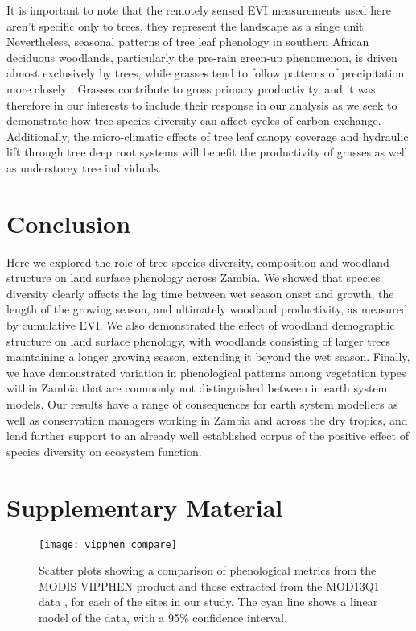 \documentclass[11pt,a4paper]{article}
\newcommand{\beginsupplement}{%
	\setcounter{table}{0}
	\renewcommand{\thetable}{S\arabic{table}}%
	\setcounter{figure}{0}
	\renewcommand{\thefigure}{S\arabic{figure}}%
	}
\begin{document}
It is important to note that the remotely sensed EVI measurements used here aren't specific only to trees, they represent the landscape as a singe unit. Nevertheless, seasonal patterns of tree leaf phenology in southern African deciduous woodlands, particularly the pre-rain green-up phenomenon, is driven almost exclusively by trees, while grasses tend to follow patterns of precipitation more closely \citep{Whitecross2017, Archibald2007, Higgins2011}. Grasses contribute to gross primary productivity, and it was therefore in our interests to include their response in our analysis as we seek to demonstrate how tree species diversity can affect cycles of carbon exchange. Additionally, the micro-climatic effects of tree leaf canopy coverage and hydraulic lift through tree deep root systems will benefit the productivity of grasses as well as understorey tree individuals.

\section{Conclusion}

Here we explored the role of tree species diversity, composition and woodland structure on land surface phenology across Zambia. We showed that species diversity clearly affects the lag time between wet season onset and growth, the length of the growing season, and ultimately woodland productivity, as measured by cumulative EVI. We also demonstrated the effect of woodland demographic structure on land surface phenology, with woodlands consisting of larger trees maintaining a longer growing season, extending it beyond the wet season. Finally, we have demonstrated variation in phenological patterns among vegetation types within Zambia that are commonly not distinguished between in earth system models. Our results have a range of consequences for earth system modellers as well as conservation managers working in Zambia and across the dry tropics, and lend further support to an already well established corpus of the positive effect of species diversity on ecosystem function.

\printbibliography

\section{Supplementary Material}
\beginsupplement

\begin{figure}[H]
\centering
	\texttt{[image: vipphen\_compare]}
	\caption{Scatter plots showing a comparison of phenological metrics from the MODIS VIPPHEN product \citep{VIPPHEN} and those extracted from the MOD13Q1 data \citep{MOD13Q1}, for each of the sites in our study. The cyan line shows a linear model of the data, with a 95\% confidence interval.}
	\label{vipphen_compare}
\end{figure}
\end{document}
